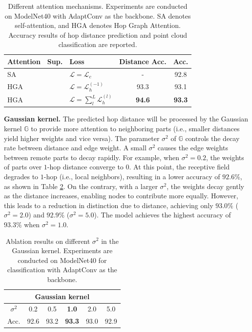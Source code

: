 \documentclass[letterpaper]{article}
\newcommand{\cmark}{\ding{51}}
\newcommand{\xmark}{\ding{55}}
\begin{document}
\setlength{\tabcolsep}{4pt}
\begin{table}
\begin{center}
\begin{adjustbox}{width=0.5\columnwidth}
\begin{tabular}{l c l c c}
\hline
Attention & Sup. & Loss & Distance Acc. & Acc.\\
\hline
SA & \cmark & $\mathcal{L} = \mathcal{L}_c $ & - & 92.8\\
HGA & \xmark & $\mathcal{L} = \mathcal{L}_h^{(-1)}$ & 93.3 & 93.1\\
HGA & \xmark & $\mathcal{L} = \sum_{l}^{L}\mathcal{L}_h^{(l)}$ & \bf{94.6} & \bf{93.3}\\
\hline
\end{tabular}
\end{adjustbox}
\end{center}
\caption{
Different attention mechanisms. Experiments are conducted on ModelNet40 with AdaptConv as the backbone.
SA denotes self-attention, and HGA denotes Hop Graph Attention.
Accuracy results of hop distance prediction and point cloud classification are reported.
}
\label{table:attention}
\end{table}


\textbf{Gaussian kernel.}
The predicted hop distance will be processed by the Gaussian kernel \(\mathbb{G}\) to provide more attention to neighboring parts (i.e., smaller distances yield higher weights and vice versa).
The parameter \(\sigma^2\) of \(\mathbb{G}\) controls the decay rate between distance and edge weight.
A small \(\sigma^2\) causes the edge weights between remote parts to decay rapidly.
For example, when \(\sigma^2=0.2\), the weights of parts over \(1\)-hop distance converge to $0$. At this point, the receptive field degrades to $1$-hop (i.e., local neighbors), resulting in a lower accuracy of $92.6\%$, as shown in Table \ref{table:ablation}.
On the contrary, with a larger $\sigma^2$, the weights decay gently as the distance increases, enabling nodes to contribute more equally.
However, this leads to a reduction in distinction due to distance, achieving only $93.0\%$ ($\sigma^2=2.0$) and $92.9\%$ ($\sigma^2=5.0$).
The model achieves the highest accuracy of $93.3\%$ when $\sigma^2=1.0$.


\begin{table}
\begin{center}
\begin{adjustbox}{width=0.66\columnwidth}
\begin{tabular}{c| c c c c c}
\hline
\multicolumn{6}{c}{Gaussian kernel}\\
\hline
$\sigma^2$ & 0.2 & 0.5 & \textbf{1.0} & 2.0 & 5.0\\
Acc. & 92.6 & 93.2 & \textbf{93.3} & 93.0 & 92.9 \\
\hline
\end{tabular}
\end{adjustbox}
\end{center}
\caption{Ablation results on different \(\sigma^2\) in the Gaussian kernel. Experiments are conducted on ModelNet40 for classification with AdaptConv as the backbone.}
\label{table:ablation}
\end{table}
\end{document}
